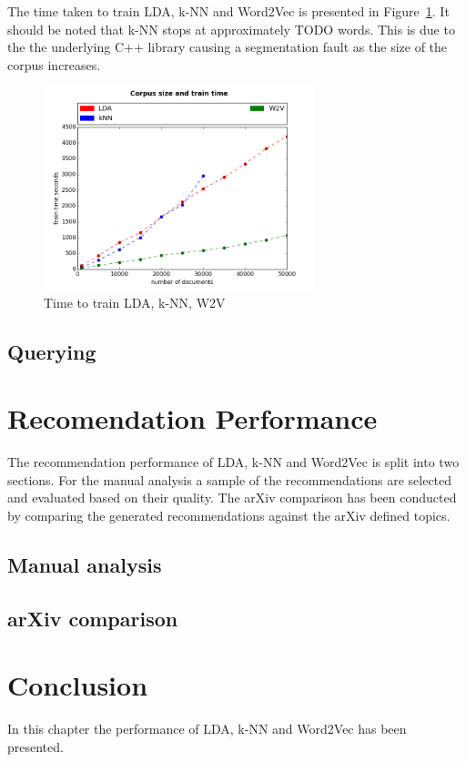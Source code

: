 The time taken to train LDA, k-NN and Word2Vec is presented in Figure~\ref{fig:TrainAll}.
It should be noted that k-NN stops at approximately TODO words.
This is due to the the underlying C++ library causing a segmentation fault as the size of the corpus increases.

\begin{figure}[h]
    \centering
        \includegraphics[width=0.7\textwidth]{Figures/TrainAll.png}
    \caption{Time to train LDA, k-NN, W2V}
    \label{fig:TrainAll}
\end{figure}

\subsection{Querying}

\section{Recomendation Performance}
The recommendation performance of LDA, k-NN and Word2Vec is split into two sections.
For the manual analysis a sample of the recommendations are selected and evaluated based on their quality.
The arXiv comparison has been conducted by comparing the generated recommendations against the arXiv defined topics.

\subsection{Manual analysis}
\subsection{arXiv comparison}

\section{Conclusion}
In this chapter the performance of LDA, k-NN and Word2Vec has been presented.
